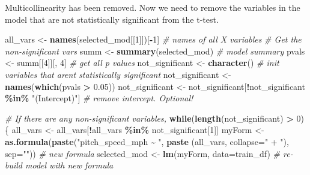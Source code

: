 \documentclass[
]{article}
\newenvironment{Shaded}{\begin{snugshade}}{\end{snugshade}}
\newcommand{\AttributeTok}[1]{\textcolor[rgb]{0.13,0.29,0.53}{#1}}
\newcommand{\CommentTok}[1]{\textcolor[rgb]{0.56,0.35,0.01}{\textit{#1}}}
\newcommand{\ControlFlowTok}[1]{\textcolor[rgb]{0.13,0.29,0.53}{\textbf{#1}}}
\newcommand{\DecValTok}[1]{\textcolor[rgb]{0.00,0.00,0.81}{#1}}
\newcommand{\FloatTok}[1]{\textcolor[rgb]{0.00,0.00,0.81}{#1}}
\newcommand{\FunctionTok}[1]{\textcolor[rgb]{0.13,0.29,0.53}{\textbf{#1}}}
\newcommand{\NormalTok}[1]{#1}
\newcommand{\OtherTok}[1]{\textcolor[rgb]{0.56,0.35,0.01}{#1}}
\newcommand{\SpecialCharTok}[1]{\textcolor[rgb]{0.81,0.36,0.00}{\textbf{#1}}}
\newcommand{\StringTok}[1]{\textcolor[rgb]{0.31,0.60,0.02}{#1}}
\begin{document}
Multicollinearity has been removed. Now we need to remove the variables
in the model that are not statistically significant from the t-test.

\begin{Shaded}
\begin{Highlighting}[]
\NormalTok{all\_vars }\OtherTok{\textless{}{-}} \FunctionTok{names}\NormalTok{(selected\_mod[[}\DecValTok{1}\NormalTok{]])[}\SpecialCharTok{{-}}\DecValTok{1}\NormalTok{]  }\CommentTok{\# names of all X variables}
\CommentTok{\# Get the non{-}significant vars}
\NormalTok{summ }\OtherTok{\textless{}{-}} \FunctionTok{summary}\NormalTok{(selected\_mod)  }\CommentTok{\# model summary}
\NormalTok{pvals }\OtherTok{\textless{}{-}}\NormalTok{ summ[[}\DecValTok{4}\NormalTok{]][, }\DecValTok{4}\NormalTok{]  }\CommentTok{\# get all p values}
\NormalTok{not\_significant }\OtherTok{\textless{}{-}} \FunctionTok{character}\NormalTok{()  }\CommentTok{\# init variables that aren\textquotesingle{}t statistically significant}
\NormalTok{not\_significant }\OtherTok{\textless{}{-}} \FunctionTok{names}\NormalTok{(}\FunctionTok{which}\NormalTok{(pvals }\SpecialCharTok{\textgreater{}} \FloatTok{0.05}\NormalTok{))}
\NormalTok{not\_significant }\OtherTok{\textless{}{-}}\NormalTok{ not\_significant[}\SpecialCharTok{!}\NormalTok{not\_significant }\SpecialCharTok{\%in\%} \StringTok{"(Intercept)"}\NormalTok{]  }\CommentTok{\# remove \textquotesingle{}intercept\textquotesingle{}. Optional!}

\CommentTok{\# If there are any non{-}significant variables, }
\ControlFlowTok{while}\NormalTok{(}\FunctionTok{length}\NormalTok{(not\_significant) }\SpecialCharTok{\textgreater{}} \DecValTok{0}\NormalTok{)\{}
\NormalTok{  all\_vars }\OtherTok{\textless{}{-}}\NormalTok{ all\_vars[}\SpecialCharTok{!}\NormalTok{all\_vars }\SpecialCharTok{\%in\%}\NormalTok{ not\_significant[}\DecValTok{1}\NormalTok{]]}
\NormalTok{  myForm }\OtherTok{\textless{}{-}} \FunctionTok{as.formula}\NormalTok{(}\FunctionTok{paste}\NormalTok{(}\StringTok{"pitch\_speed\_mph \textasciitilde{} "}\NormalTok{, }\FunctionTok{paste}\NormalTok{ (all\_vars, }\AttributeTok{collapse=}\StringTok{" + "}\NormalTok{), }\AttributeTok{sep=}\StringTok{""}\NormalTok{))  }\CommentTok{\# new formula}
\NormalTok{  selected\_mod }\OtherTok{\textless{}{-}} \FunctionTok{lm}\NormalTok{(myForm, }\AttributeTok{data=}\NormalTok{train\_df)  }\CommentTok{\# re{-}build model with new formula}
  

\end{Highlighting}
\end{Shaded}
\end{document}
